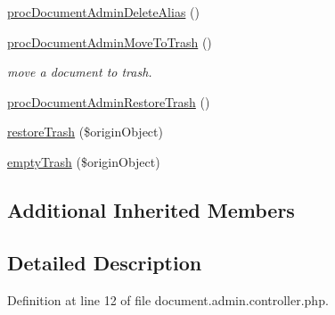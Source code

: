 \begin{DoxyCompactItemize}
\item 
\hyperlink{classdocumentAdminController_ab2f0c552145e0a56841e0aa7e8e03ae7}{proc\-Document\-Admin\-Delete\-Alias} ()
\item 
\hyperlink{classdocumentAdminController_a8dfa5d37621daaba6c66732eb3568730}{proc\-Document\-Admin\-Move\-To\-Trash} ()
\begin{DoxyCompactList}\small\item\em move a document to trash. \end{DoxyCompactList}\item 
\hyperlink{classdocumentAdminController_ac0467d27983d60c51c1128765244a36b}{proc\-Document\-Admin\-Restore\-Trash} ()
\item 
\hyperlink{classdocumentAdminController_a3750ffc8b40a8bbd46f5ac455e65cb37}{restore\-Trash} (\$origin\-Object)
\item 
\hyperlink{classdocumentAdminController_a52981a3af3d6b94661444f65568343ca}{empty\-Trash} (\$origin\-Object)
\end{DoxyCompactItemize}
\subsection*{Additional Inherited Members}


\subsection{Detailed Description}


Definition at line 12 of file document.\-admin.\-controller.\-php.



